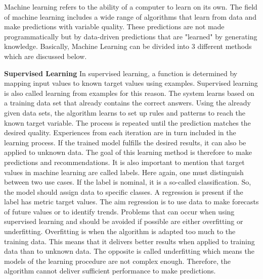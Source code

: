 Machine learning refers to the ability of a computer to learn on its own.
The field of machine learning includes a wide range of algorithms that learn
from data and make predictions with variable quality.
These predictions are not made programmatically but by data-driven predictions
that are "learned" by generating knowledge. Basically,
Machine Learning can be divided into 3 different methods which are discussed below.\cite[4]{2018VDMAQuick}

\textbf{Supervised Learning}
In supervised learning, a function is determined by mapping input values to known target
values using examples. Supervised learning is also called learning from examples for this reason.\cite[96]{schacht2019blockchain}
The system learns based on a training data set that already contains the correct answers.
Using the already given data sets, the algorithm learns to set up rules and patterns to
reach the known target variable. The process is repeated until the prediction matches the desired quality.
Experiences from each iteration are in turn included in the learning process.
If the trained model fulfills the desired results, it can also be applied to unknown data.
The goal of this learning method is therefore to make predictions and recommendations.\cite[96]{schacht2019blockchain}
It is also important to mention that target values in machine learning are called labels.
Here again, one must distinguish between two use cases. If the label is nominal, it is a so-called
classification. So, the model should assign data to specific classes.
A regression is present if the label has metric target values.\cite[46]{Paass2020}
The aim regression is to use data to make forecasts of future values or to identify trends.
Problems that can occur when using supervised learning and should be avoided if possible
are either overfitting or underfitting.  Overfitting is when the algorithm is adapted too much
to the training data.
This means that it delivers better results when applied to training data than to unknown data.
The opposite is called underfitting which means the models of the learning procedure are not complex
enough.
Therefore, the algorithm cannot deliver sufficient performance to make predictions.\cite{buxmann2018künstliche}


